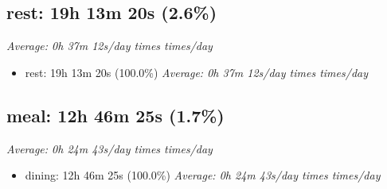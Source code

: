 \documentclass[12pt]{extarticle}
\begin{document}
{\fontsize{16}{19.2}\selectfont\subsection*{rest: 19h 13m 20s (2.6\%)}}
\textit{Average: 0h 37m 12s/day  times  times/day}\par
\begin{itemize}[topsep=0pt, itemsep=-0.5ex]
    \item rest: 19h 13m 20s (100.0\%)
        \textit{Average: 0h 37m 12s/day  times  times/day}\par
\end{itemize}
{\fontsize{16}{19.2}\selectfont\subsection*{meal: 12h 46m 25s (1.7\%)}}
\textit{Average: 0h 24m 43s/day  times  times/day}\par
\begin{itemize}[topsep=0pt, itemsep=-0.5ex]
    \item dining: 12h 46m 25s (100.0\%)
        \textit{Average: 0h 24m 43s/day  times  times/day}\par
\end{itemize}
\end{document}
